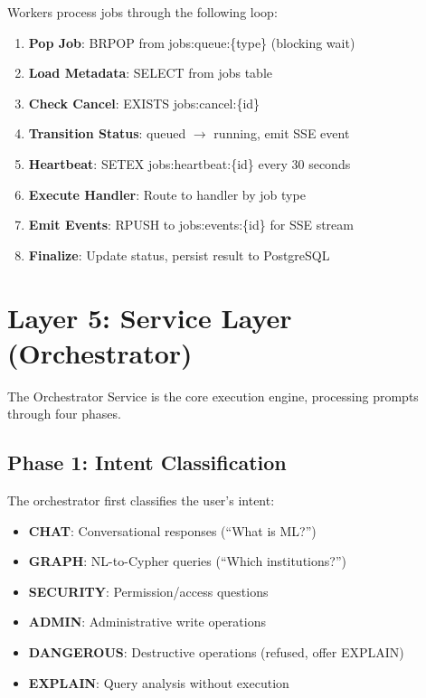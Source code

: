 \documentclass[a4paper,twoside]{sapthesis}
\begin{document}
Workers process jobs through the following loop:

\begin{enumerate}
    \item \textbf{Pop Job}: BRPOP from jobs:queue:\{type\} (blocking wait)
    \item \textbf{Load Metadata}: SELECT from jobs table
    \item \textbf{Check Cancel}: EXISTS jobs:cancel:\{id\}
    \item \textbf{Transition Status}: queued $\rightarrow$ running, emit SSE event
    \item \textbf{Heartbeat}: SETEX jobs:heartbeat:\{id\} every 30 seconds
    \item \textbf{Execute Handler}: Route to handler by job type
    \item \textbf{Emit Events}: RPUSH to jobs:events:\{id\} for SSE stream
    \item \textbf{Finalize}: Update status, persist result to PostgreSQL
\end{enumerate}

\section{Layer 5: Service Layer (Orchestrator)}
\label{sec:layer5-orchestrator}

The Orchestrator Service is the core execution engine, processing prompts through four phases.

\subsection{Phase 1: Intent Classification}
\label{subsec:phase1-intent}

The orchestrator first classifies the user's intent:

\begin{itemize}
    \item \textbf{CHAT}: Conversational responses (``What is ML?'')
    \item \textbf{GRAPH}: NL-to-Cypher queries (``Which institutions?'')
    \item \textbf{SECURITY}: Permission/access questions
    \item \textbf{ADMIN}: Administrative write operations
    \item \textbf{DANGEROUS}: Destructive operations (refused, offer EXPLAIN)
    \item \textbf{EXPLAIN}: Query analysis without execution
\end{itemize}
\end{document}
